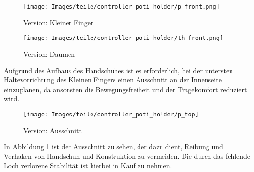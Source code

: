 \begin{minipage}{0.5\textwidth}
    \begin{figure}[H]
        \texttt{[image: Images/teile/controller\_poti\_holder/p\_front.png]}
        \centering
        \caption{Version: Kleiner Finger}
    \end{figure}
\end{minipage}
\begin{minipage}{0.5\textwidth}
    \begin{figure}[H]
        \texttt{[image: Images/teile/controller\_poti\_holder/th\_front.png]}
        \centering
        \caption{Version: Daumen}
    \end{figure}
\end{minipage}

Aufgrund des Aufbaus des Handschuhes ist es erforderlich, bei der untersten Haltevorrichtung des Kleinen Fingers einen Ausschnitt an der 
Innenseite einzuplanen, da ansonsten die Bewegungsfreiheit und der Tragekomfort reduziert wird.

\begin{minipage}{0.5\textwidth}
    \begin{figure}[H]
        \texttt{[image: Images/teile/controller\_poti\_holder/p\_top]}
        \centering
        \caption{Version: Ausschnitt}
        \label{cut}
    \end{figure}
\end{minipage}
\begin{minipage}{0.5\textwidth}
    In Abbildung \ref{cut} ist der Ausschnitt zu sehen, der dazu dient, Reibung und Verhaken von 
    Handschuh und Konstruktion zu vermeiden. Die durch das fehlende Loch verlorene Stabilität 
    ist hierbei in Kauf zu nehmen. 
    
\end{minipage}

